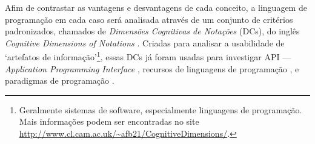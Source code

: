Afim de contrastar as vantagens e desvantagens de cada conceito, a linguagem de
programação em cada caso será analisada através de um conjunto de critérios
padronizados, chamados de \emph{Dimensões Cognitivas de Notações} (DCs), do inglês
\emph{Cognitive Dimensions of Notations} \cite{green1989}.
Criadas para analisar a usabilidade de ‘artefatos de
informação’\footnote{Geralmente sistemas de software, especialmente linguagens de
programação. Mais informações podem ser encontradas no site
\url{http://www.cl.cam.ac.uk/\~afb21/CognitiveDimensions/}.}, essas DCs já foram usadas para investigar API
— \emph{Application Programming Interface} \cite{clarke2003}, recursos de linguagens
de programação \cite{sadowski2011}, e paradigmas de programação \cite{kiss2014}.

